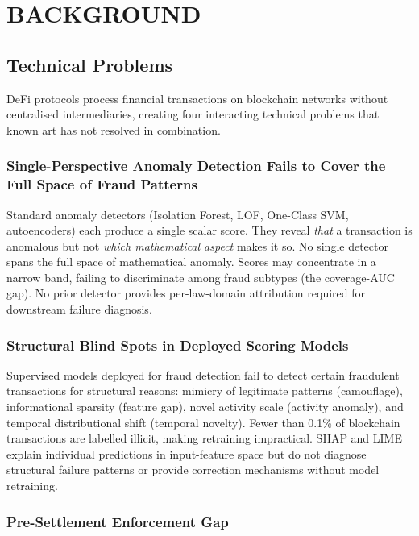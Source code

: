 \documentclass[12pt,a4paper]{article}
\begin{document}
\section{BACKGROUND}

\subsection{Technical Problems}

DeFi protocols process financial transactions on blockchain networks
without centralised intermediaries, creating four interacting technical
problems that known art has not resolved in combination.

\subsubsection{Single-Perspective Anomaly Detection Fails to Cover
the Full Space of Fraud Patterns}

Standard anomaly detectors (Isolation Forest, LOF, One-Class SVM,
autoencoders) each produce a single scalar score. They reveal \emph{that}
a transaction is anomalous but not \emph{which mathematical aspect} makes
it so. No single detector spans the full space of mathematical anomaly.
Scores may concentrate in a narrow band, failing to discriminate among
fraud subtypes (the coverage-AUC gap). No prior detector provides
per-law-domain attribution required for downstream failure diagnosis.

\subsubsection{Structural Blind Spots in Deployed Scoring Models}

Supervised models deployed for fraud detection fail to detect certain
fraudulent transactions for structural reasons: mimicry of legitimate
patterns (camouflage), informational sparsity (feature gap), novel
activity scale (activity anomaly), and temporal distributional shift
(temporal novelty). Fewer than 0.1\% of blockchain transactions are
labelled illicit, making retraining impractical. SHAP and LIME explain
individual predictions in input-feature space but do not diagnose
structural failure patterns or provide correction mechanisms without
model retraining.

\subsubsection{Pre-Settlement Enforcement Gap}
\end{document}
